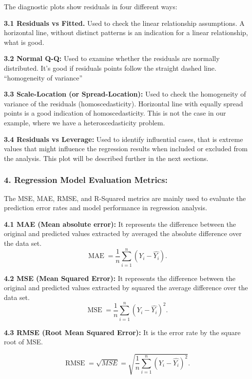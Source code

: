 \documentclass[11pt]{article}
\begin{document}
The diagnostic plots show residuals in four different ways:

\textbf{3.1 Residuals vs Fitted.} Used to check the linear relationship
assumptions. A horizontal line, without distinct patterns is an
indication for a linear relationship, what is good.

\textbf{3.2 Normal Q-Q:} Used to examine whether the residuals are
normally distributed. It's good if residuals points follow the straight
dashed line. ``homogeneity of variance''

\textbf{3.3 Scale-Location (or Spread-Location):} Used to check the
homogeneity of variance of the residuals (homoscedasticity). Horizontal
line with equally spread points is a good indication of
homoscedasticity. This is not the case in our example, where we have a
heteroscedasticity problem.

\textbf{3.4 Residuals vs Leverage:} Used to identify influential cases,
that is extreme values that might influence the regression results when
included or excluded from the analysis. This plot will be described
further in the next sections.

\hypertarget{regression-model-evaluation-metrics}{%
\subsubsection{4. Regression Model Evaluation
Metrics:}\label{regression-model-evaluation-metrics}}

The MSE, MAE, RMSE, and R-Squared metrics are mainly used to evaluate
the prediction error rates and model performance in regression analysis.

\textbf{4.1 MAE (Mean absolute error):} It represents the difference
between the original and predicted values extracted by averaged the
absolute difference over the data set.
\[{\displaystyle \operatorname {MAE} ={\frac {1}{n}}\sum _{i=1}^{n}(Y_{i}-{\hat {Y_{i}}}).}\]

\textbf{4.2 MSE (Mean Squared Error):} It represents the difference
between the original and predicted values extracted by squared the
average difference over the data set.
\[{\displaystyle \operatorname {MSE} ={\frac {1}{n}}\sum _{i=1}^{n}(Y_{i}-{\hat {Y_{i}}})^{2}.}\]

\textbf{4.3 RMSE (Root Mean Squared Error):} It is the error rate by the
square root of MSE.

\[{\displaystyle \operatorname {RMSE} ={\sqrt{MSE}} = {\sqrt {\frac {1}{n}\sum _{i=1}^{n}(Y_{i}-{\hat {Y_{i}}})^{2}}}.}\]
\end{document}
